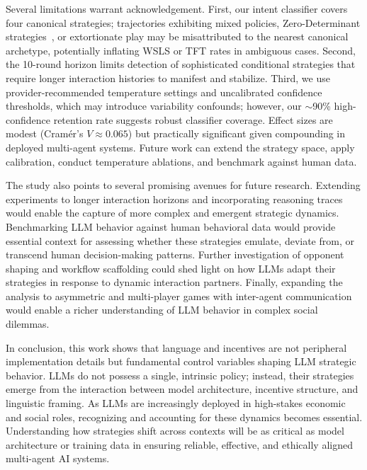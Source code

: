 \documentclass{article}
\begin{document}
Several limitations warrant acknowledgement. First, our intent classifier covers four canonical strategies; trajectories exhibiting mixed policies, Zero-Determinant strategies~\cite{pressDyson2012,hilbe2013memory}, or extortionate play may be misattributed to the nearest canonical archetype, potentially inflating WSLS or TFT rates in ambiguous cases. Second, the 10-round horizon limits detection of sophisticated conditional strategies that require longer interaction histories to manifest and stabilize. Third, we use provider-recommended temperature settings and uncalibrated confidence thresholds, which may introduce variability confounds; however, our $\sim$90\% high-confidence retention rate suggests robust classifier coverage. Effect sizes are modest (Cramér's $V \approx 0.065$) but practically significant given compounding in deployed multi-agent systems. Future work can extend the strategy space, apply calibration, conduct temperature ablations, and benchmark against human data.

The study also points to several promising avenues for future research. Extending experiments to longer interaction horizons and incorporating reasoning traces would enable the capture of more complex and emergent strategic dynamics. Benchmarking LLM behavior against human behavioral data would provide essential context for assessing whether these strategies emulate, deviate from, or transcend human decision-making patterns. Further investigation of opponent shaping and workflow scaffolding could shed light on how LLMs adapt their strategies in response to dynamic interaction partners. Finally, expanding the analysis to asymmetric and multi-player games with inter-agent communication would enable a richer understanding of LLM behavior in complex social dilemmas.

In conclusion, this work shows that language and incentives are not peripheral implementation details but fundamental control variables shaping LLM strategic behavior. LLMs do not possess a single, intrinsic policy; instead, their strategies emerge from the interaction between model architecture, incentive structure, and linguistic framing. As LLMs are increasingly deployed in high-stakes economic and social roles, recognizing and accounting for these dynamics becomes essential. Understanding how strategies shift across contexts will be as critical as model architecture or training data in ensuring reliable, effective, and ethically aligned multi-agent AI systems.

\end{document}
